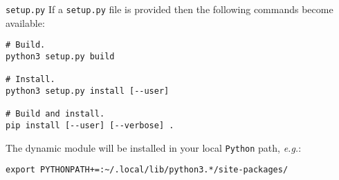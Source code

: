 \documentclass[aspectratio=169,11pt]{beamer}
\begin{document}
\begin{frame}[fragile]{\texttt{setup.py}}
    If a \texttt{setup.py} file is provided then the following commands become available:
    \begin{verbatim}
# Build.
python3 setup.py build

# Install.
python3 setup.py install [--user]

# Build and install.
pip install [--user] [--verbose] .
    \end{verbatim}
    The dynamic module will be installed in your local \texttt{Python} path, \textit{e.g.}:
    \begin{verbatim}
export PYTHONPATH+=:~/.local/lib/python3.*/site-packages/
    \end{verbatim}
\end{frame}
\end{document}
